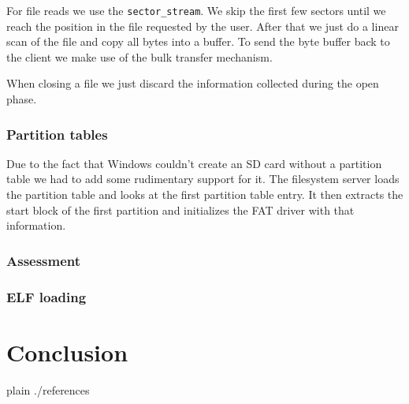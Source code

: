 \documentclass[a4paper,10pt]{article}
\begin{document}
For file reads we use the \lstinline!sector_stream!.
We skip the first few sectors until we reach the position in the file requested by the user.
After that we just do a linear scan of the file and copy all bytes into a buffer.
To send the byte buffer back to the client we make use of the bulk transfer mechanism.

When closing a file we just discard the information collected during the open phase.

\subsubsection{Partition tables}

Due to the fact that Windows couldn't create an SD card without a partition table we had to add some rudimentary support for it.
The filesystem server loads the partition table and looks at the first partition table entry.
It then extracts the start block of the first partition and initializes the FAT driver with that information.

\subsubsection{Assessment}


\subsubsection{ ELF loading}


\section{Conclusion}

\begin{flushleft}
{{{
 {plain}
 {./references}
}}}
\end{flushleft}


\todos
\end{document}
